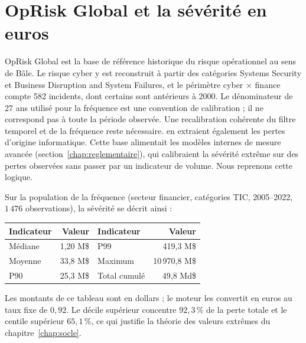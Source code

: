 
\section{OpRisk Global et la sévérité en euros}
\label{sec:oprisk}


OpRisk Global est la base de référence historique du risque opérationnel au sens de Bâle. Le risque cyber y est reconstruit à
partir des catégories \og Systems Security\fg{} et \og Business Disruption and System Failures\fg{}, et
le périmètre cyber $\times$ finance compte 582 incidents, dont certains sont antérieurs à 2000. Le dénominateur de 27 ans utilisé pour la fréquence est une convention de calibration ; il ne correspond pas à toute la période observée. Une recalibration cohérente du filtre temporel et de la fréquence reste nécessaire. \citet{elingwirfs2019}
en extraient également les pertes d'origine informatique. Cette base alimentait les modèles internes de
mesure avancée (section~\ref{chap:reglementaire}), qui calibraient la sévérité extrême sur des pertes
observées sans passer par un indicateur de volume. Nous reprenons cette logique.

Sur la population de la fréquence (secteur financier, catégories TIC, 2005--2022, $1\,476$
observations), la sévérité se décrit ainsi :
\begin{center}
\renewcommand{\arraystretch}{1.3}
\begin{tabular}{l r l r}
\toprule
\rowcolor{lightblue}
\textbf{Indicateur} & \textbf{Valeur} & \textbf{Indicateur} & \textbf{Valeur} \\
\midrule
Médiane & 1{,}20 M\$ & P99 & 419{,}3 M\$ \\
Moyenne & 33{,}8 M\$ & Maximum & 10\,970{,}8 M\$ \\
P90 & 25{,}3 M\$ & Total cumulé & 49{,}8 Md\$ \\
\bottomrule
\end{tabular}
\end{center}
Les montants de ce tableau sont en dollars ; le moteur les convertit en euros au taux fixe de $0{,}92$. Le décile supérieur concentre $92{,}3\,\%$ de la perte totale et le centile supérieur $65{,}1\,\%$,
ce qui justifie la théorie des valeurs extrêmes du chapitre~\ref{chap:socle}.

